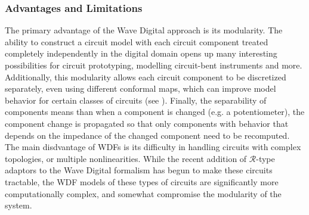 \documentclass[twoside,a4paper]{article}
\begin{document}
\subsubsection{Advantages and Limitations}
The primary advantage of the Wave Digital approach is its modularity.
The ability to construct a circuit model with each circuit component
treated completely independently in the digital domain opens up many
interesting possibilities for circuit prototyping, modelling circuit-bent
instruments and more. Additionally, this modularity allows each circuit
component to be discretized separately, even using different conformal
maps, which can improve model behavior for certain classes of circuits
(see \cite{Germain}). Finally, the separability of components means than
when a component is changed (e.g. a potentiometer), the component change
is propagated so that only components with behavior that depends on the
impedance of the changed component need to be recomputed.
\newline\newline
The main disdvantage of WDFs is its difficulty in handling circuits with
complex topologies, or multiple nonlinearities. While the recent addition
of $\mathcal{R}$-type adaptors to the Wave Digital formalism \cite{KurtThesis}
has begun to make these circuits tractable, the WDF models of these types of
circuits are significantly more computationally complex, and somewhat
compromise the modularity of the system.
\end{document}
